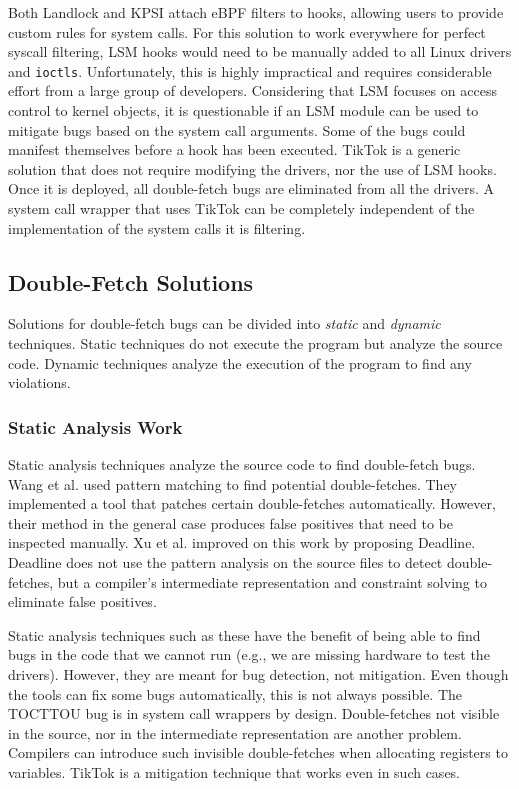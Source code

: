 Both Landlock and KPSI attach eBPF filters to hooks, allowing users to provide
custom rules for system calls. For this solution to work everywhere for perfect
syscall filtering, LSM hooks would need to be manually added to all Linux
drivers and \texttt{ioctls}. Unfortunately, this is highly impractical and requires
considerable effort from a large group of developers. Considering that LSM
focuses on access control to kernel objects, it is questionable if an LSM module
can be used to mitigate bugs based on the system call arguments. Some of the
bugs could manifest themselves before a hook has been executed. TikTok is a
generic solution that does not require modifying the drivers, nor the use of
LSM hooks. Once it is deployed, all double-fetch bugs are eliminated from all
the drivers. A system call wrapper that uses TikTok can be completely
independent of the implementation of the system calls it is filtering.

\subsection{Double-Fetch Solutions}

Solutions for double-fetch bugs can be divided into \emph{static} and
\emph{dynamic} techniques. Static techniques do not execute the program but
analyze the source code. Dynamic techniques analyze the execution of the
program to find any violations.

\subsubsection{Static Analysis Work}
\label{subsec:dfstatic}
Static analysis techniques analyze the source code to find double-fetch bugs.
Wang et al. \cite{wang2017double} used pattern matching to find potential
double-fetches. They implemented a tool that patches certain double-fetches
automatically. However, their method in the general case produces false
positives that need to be inspected manually. Xu et al.\cite{xu2018precise}
improved on this work by proposing Deadline. Deadline does not use the pattern 
analysis on the source files to detect double-fetches, but a compiler's
intermediate representation and constraint solving to eliminate false positives.

Static analysis techniques such as these have the benefit of being able to find
bugs in the code that we cannot run (e.g., we are missing hardware to test the
drivers). However, they are meant for bug detection, not mitigation. Even though
the tools can fix some bugs automatically, this is not always possible. The
TOCTTOU bug is in system call wrappers by design. Double-fetches not visible in
the source, nor in the intermediate representation are another problem.
Compilers can introduce such invisible double-fetches when allocating registers
to variables. TikTok is a mitigation technique that works even in such cases.



